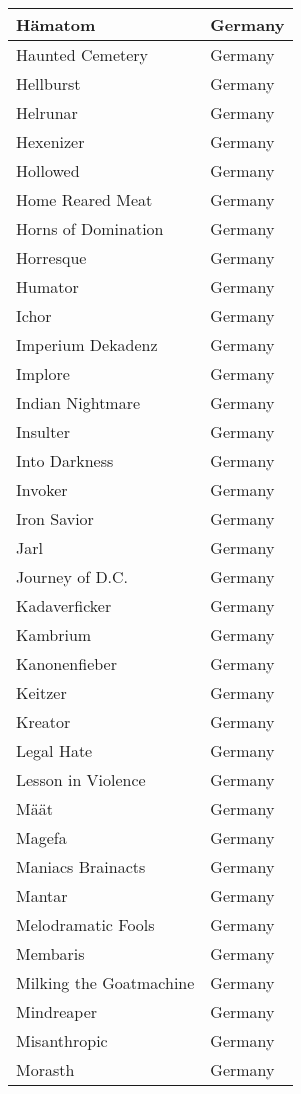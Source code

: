 \documentclass[12pt, a4paper, twoside]{report}
\begin{document}
\begin{center}
\begin{longtable}{|p{5cm}|p{5cm}|}
Hämatom & Germany \\ \hline
Haunted Cemetery & Germany \\ \hline
Hellburst & Germany \\ \hline
Helrunar & Germany \\ \hline
Hexenizer & Germany \\ \hline
Hollowed & Germany \\ \hline
Home Reared Meat & Germany \\ \hline
Horns of Domination & Germany \\ \hline
Horresque & Germany \\ \hline
Humator & Germany \\ \hline
Ichor & Germany \\ \hline
Imperium Dekadenz & Germany \\ \hline
Implore & Germany \\ \hline
Indian Nightmare & Germany \\ \hline
Insulter & Germany \\ \hline
Into Darkness & Germany \\ \hline
Invoker & Germany \\ \hline
Iron Savior & Germany \\ \hline
Jarl & Germany \\ \hline
Journey of D.C. & Germany \\ \hline
Kadaverficker & Germany \\ \hline
Kambrium & Germany \\ \hline
Kanonenfieber & Germany \\ \hline
Keitzer & Germany \\ \hline
Kreator & Germany \\ \hline
Legal Hate & Germany \\ \hline
Lesson in Violence & Germany \\ \hline
Määt & Germany \\ \hline
Magefa & Germany \\ \hline
Maniacs Brainacts & Germany \\ \hline
Mantar & Germany \\ \hline
Melodramatic Fools & Germany \\ \hline
Membaris & Germany \\ \hline
Milking the Goatmachine & Germany \\ \hline
Mindreaper & Germany \\ \hline
Misanthropic & Germany \\ \hline
Morasth & Germany \\ \hline

\end{longtable}
\end{center}
\end{document}
